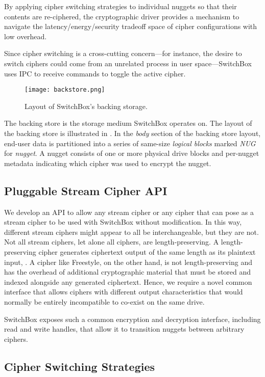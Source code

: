 By applying cipher switching strategies to individual nuggets so that their
contents are re-ciphered, the cryptographic driver provides a mechanism to
navigate the latency/energy/security tradeoff space of cipher configurations
with low overhead.

Since cipher switching is a cross-cutting concern---for instance, the desire to
switch ciphers could come from an unrelated process in user space---SwitchBox
uses IPC to receive commands to toggle the active cipher.

\begin{figure}[t]
\centering
\texttt{[image: backstore.png]}
 \caption{Layout of SwitchBox's backing storage.}\label{fig:backstore2}
\end{figure}

The backing store is the storage medium SwitchBox operates on. The layout of the
backing store is illustrated in . In the \textit{body}
section of the backing store layout, end-user data is partitioned into a series
of same-size \emph{logical blocks} marked \textit{NUG} for \emph{nugget}. A
nugget consists of one or more physical drive blocks and per-nugget metadata
indicating which cipher was used to encrypt the nugget.

\subsection{Pluggable Stream Cipher API}

We develop an API to allow any stream cipher or any cipher that can pose as a
stream cipher to be used with SwitchBox without modification. In this way,
different stream ciphers might appear to all be interchangeable, but they are
not. Not all stream ciphers, let alone all ciphers, are length-preserving. A
length-preserving cipher generates ciphertext output of the same length as its
plaintext input, . A cipher like Freestyle, on the other hand, is
not length-preserving and has the overhead of additional cryptographic material
that must be stored and indexed alongside any generated ciphertext. Hence, we
require a novel common interface that allows ciphers with different output
characteristics that would normally be entirely incompatible to co-exist on the
same drive.

SwitchBox exposes such a common encryption and decryption interface, including
read and write handles, that allow it to transition nuggets between arbitrary
ciphers.

\subsection{Cipher Switching Strategies}

